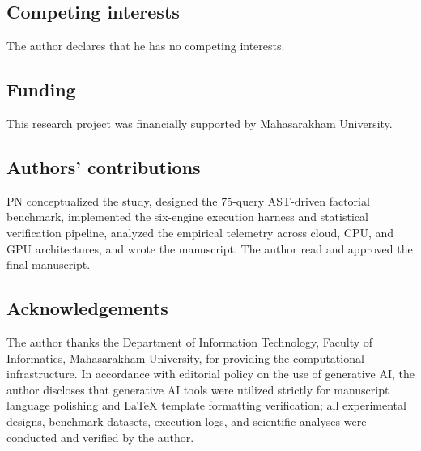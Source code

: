 \documentclass[10pt,a4paper]{article}
\begin{document}
\subsection*{Competing interests}
The author declares that he has no competing interests.

\subsection*{Funding}
This research project was financially supported by Mahasarakham University.

\subsection*{Authors' contributions}
PN conceptualized the study, designed the 75-query AST-driven factorial benchmark, implemented the six-engine execution harness and statistical verification pipeline, analyzed the empirical telemetry across cloud, CPU, and GPU architectures, and wrote the manuscript. The author read and approved the final manuscript.

\subsection*{Acknowledgements}
The author thanks the Department of Information Technology, Faculty of Informatics, Mahasarakham University, for providing the computational infrastructure. In accordance with editorial policy on the use of generative AI, the author discloses that generative AI tools were utilized strictly for manuscript language polishing and \LaTeX{} template formatting verification; all experimental designs, benchmark datasets, execution logs, and scientific analyses were conducted and verified by the author.
\end{document}
